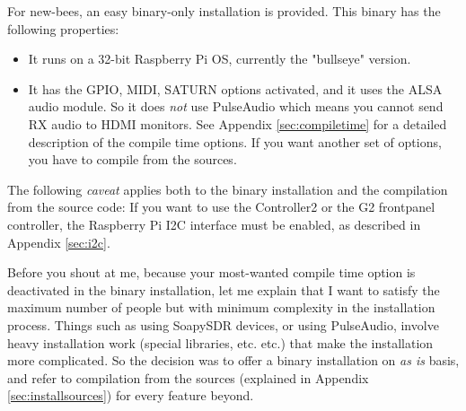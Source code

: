 \documentclass[12pt]{book}
\begin{document}
For new-bees, an easy binary-only installation is provided. This binary has the following
properties:

\begin{itemize}
\item{It runs on a 32-bit Raspberry Pi OS, currently the "bullseye" version.}
\item{It has the GPIO, MIDI, SATURN options activated, and it uses the ALSA audio
module.  So it does \textit{not} use PulseAudio
which means you cannot send RX audio to HDMI monitors. See
Appendix \ref{sec:compiletime} for a detailed description of the compile time options. If you want
another set of options, you have to compile from the sources.}
\end{itemize}

The following \textit{caveat} applies both to the binary installation and the compilation from
the source code: If you want to use the Controller2 or the G2 frontpanel controller,
 the Raspberry Pi I2C interface
must be enabled, as described in Appendix \ref{sec:i2c}.

\begin{center}
\end{center}


Before you shout at me, because your most-wanted compile time option is deactivated in the
binary installation, let me explain that I want to satisfy the maximum number of people but
with minimum complexity in the installation process. Things such as using SoapySDR devices,
or using PulseAudio, involve heavy installation work (special libraries, etc. etc.) that make
the installation more complicated. So the decision was to offer a binary installation on
\textit{as is} basis, and refer to compilation from the sources
 (explained in Appendix \ref{sec:installsources})
for every feature beyond.
\end{document}
